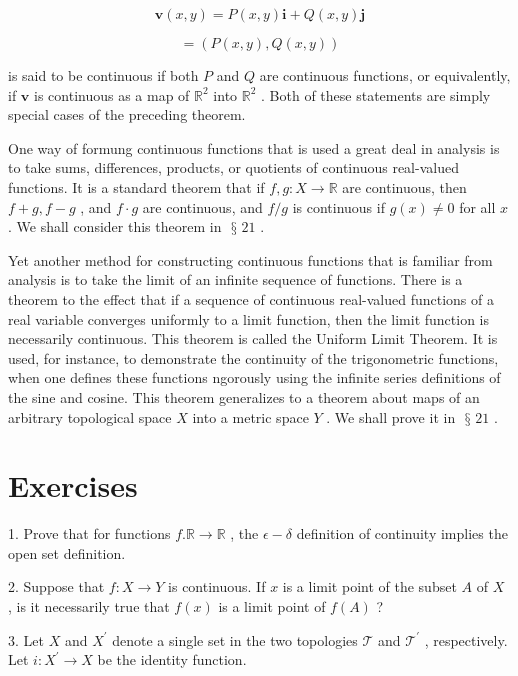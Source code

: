 \documentclass[10pt]{article}
\begin{document}
\[
\mathbf{v}\left( {x,y}\right)  = P\left( {x,y}\right) \mathbf{i} + Q\left( {x,y}\right) \mathbf{j}
\]

\[
= \left( {P\left( {x,y}\right) ,Q\left( {x,y}\right) }\right)
\]

is said to be continuous if both \(P\) and \(Q\) are continuous functions, or equivalently, if \(\mathbf{v}\) is continuous as a map of \({\mathbb{R}}^{2}\) into \({\mathbb{R}}^{2}\) . Both of these statements are simply special cases of the preceding theorem.

One way of formung continuous functions that is used a great deal in analysis is to take sums, differences, products, or quotients of continuous real-valued functions. It is a standard theorem that if \(f,g : X \rightarrow  \mathbb{R}\) are continuous, then \(f + g,f - g\) , and \(f \cdot  g\) are continuous, and \(f/g\) is continuous if \(g\left( x\right)  \neq  0\) for all \(x\) . We shall consider this theorem in \(\text{ § }{21}\) .

Yet another method for constructing continuous functions that is familiar from analysis is to take the limit of an infinite sequence of functions. There is a theorem to the effect that if a sequence of continuous real-valued functions of a real variable converges uniformly to a limit function, then the limit function is necessarily continuous. This theorem is called the Uniform Limit Theorem. It is used, for instance, to demonstrate the continuity of the trigonometric functions, when one defines these functions ngorously using the infinite series definitions of the sine and cosine. This theorem generalizes to a theorem about maps of an arbitrary topological space \(X\) into a metric space \(Y\) . We shall prove it in \(\text{ § }{21}\) .

\section*{Exercises}

1. Prove that for functions \(f.\mathbb{R} \rightarrow  \mathbb{R}\) , the \(\epsilon  - \delta\) definition of continuity implies the open set definition.

2. Suppose that \(f : X \rightarrow  Y\) is continuous. If \(x\) is a limit point of the subset \(A\) of \(X\) , is it necessarily true that \(f\left( x\right)\) is a limit point of \(f\left( A\right)\) ?

3. Let \(X\) and \({X}^{\prime }\) denote a single set in the two topologies \(\mathcal{T}\) and \({\mathcal{T}}^{\prime }\) , respectively. Let \(i : {X}^{\prime } \rightarrow  X\) be the identity function.
\end{document}
